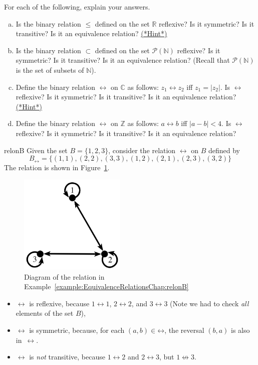 \begin{exercise}{17}
For each of the following, explain your answers. 
\begin{enumerate}[(a)]
\item Is the binary relation $\leq$ defined on the set $\mathbb{R}$ reflexive? Is it symmetric? Is it transitive? Is it an equivalence relation?
\hyperref[secEqRelChapHints]{(*Hint*)}
\item Is  the binary relation $\subset$ defined on the set $\mathcal{P}(\mathbb{N})$ reflexive? Is it symmetric? Is it transitive? Is it an equivalence relation? (Recall that $\mathcal{P}(\mathbb{N})$ is the set of subsets of $\mathbb{N}$).
\item Define the binary relation $\rel$ on $\mathbb{C}$ as follows: $ z_1 \rel z_2$ iff $z_1 = |z_2|$. Is $\rel$ reflexive? Is it symmetric? Is it transitive? Is it an equivalence relation? \hyperref[secEqRelChapHints]{(*Hint*)} 
\item Define the binary relation $\rel$ on $\mathbb{Z}$ as follows: $ a \rel b$ iff $|a - b|< 4$. Is $\rel$ reflexive? Is it symmetric? Is it transitive? Is it an equivalence relation?
\end{enumerate}
\end{exercise}

\begin{example}{relonB}
Given the set $B = \{1,2,3\}$, consider the relation $\rel$ on $B$ defined by 
\[
B_\rel = \{(1,1), (2,2), (3,3), (1,2), (2,1), (2,3), (3,2) \}
\]
 The relation is shown in Figure~\ref{fig:relonB}.
\begin{figure}[htpb]
\begin{center}
 \includegraphics[width=2in]{images/relonB.png}
\caption{Diagram of the relation in Example~\ref{example:EquivalenceRelationsChap:relonB}\label{fig:relonB}}
\end{center}
\end{figure}

\begin{itemize}
\item $\rel$ is reflexive, because $1 \rel 1$, $2 \rel 2$, and $3 \rel 3$  (Note we had to check \emph{all} elements of the set $B$),
\item $\rel$ is symmetric, because, for each $(a,b) \in \mathord{\rel}$, the reversal $(b,a)$ is also in~$\rel$.
\item $\rel$ is \emph{not} transitive, because $1 \rel 2$ and $2 \rel 3$, but $1 \not\rel 3$.
\end{itemize}
\end{example}

